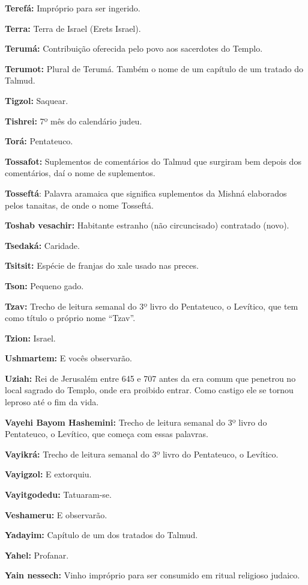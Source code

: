 \begin{hangparas}{.25in}{1}
{\textbf{Terefá:} Impróprio para ser ingerido.

\textbf{Terra:} Terra de Israel (Erets Israel).

\textbf{Terumá:} Contribuição oferecida pelo povo aos sacerdotes do Templo.

\textbf{Terumot:} Plural de Terumá. Também o nome de um capítulo de um tratado do Talmud.

\textbf{Tigzol:} Saquear.

\textbf{Tishrei:} 7º mês do calendário judeu.

\textbf{Torá:} Pentateuco.

\textbf{Tossafot:} Suplementos de comentários do Talmud que surgiram
bem depois dos comentários, daí o nome de suplementos.

\textbf{Tosseftá}: Palavra aramaica que significa suplementos da Mishná
elaborados pelos tanaitas, de onde o nome Tosseftá.

\textbf{Toshab vesachir:} Habitante estranho (não circuncisado) contratado (novo).

\textbf{Tsedaká:} Caridade.

\textbf{Tsitsit:} Espécie de franjas do xale usado nas preces.

\textbf{Tson:} Pequeno gado.

\textbf{Tzav:} Trecho de leitura semanal do 3º livro do Pentateuco, o
Levítico, que tem como título o próprio nome ``Tzav''.

\textbf{Tzion:} Israel.

\textbf{Ushmartem:} E vocês observarão.

\textbf{Uziah:} Rei de Jerusalém entre 645 e 707 antes da era comum que penetrou no local
sagrado do Templo, onde era proibido entrar. Como castigo ele se tornou
leproso até o fim da vida.

\textbf{Vayehi Bayom Hashemini:} Trecho de leitura semanal do 3º livro do Pentateuco, o Levítico, que começa com essas palavras.

\textbf{Vayikrá:} Trecho de leitura semanal do 3º livro do Pentateuco, o Levítico.

\textbf{Vayigzol:} E extorquiu.

\textbf{Vayitgodedu:} Tatuaram-se.

\textbf{Veshameru:} E observarão.

\textbf{Yadayim:} Capítulo de um dos tratados do Talmud.

\textbf{Yahel:} Profanar.

\textbf{Yain nessech:} Vinho impróprio para ser consumido em ritual religioso judaico.

}
\end{hangparas}
